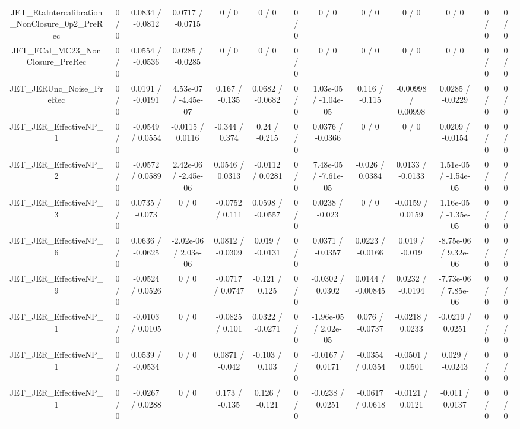 \documentclass[10pt]{article}
\begin{document}
\begin{table}[htbp]
\begin{center}
\begin{tabular}{|c|c|c|c|c|c|c|c|c|c|c|c|c|}
  JET_EtaIntercalibration_NonClosure_0p2_PreRec & 0 / 0 & 0.0834 / -0.0812 & 0.0717 / -0.0715 & 0 / 0 & 0 / 0 & 0 / 0 & 0 / 0 & 0 / 0 & 0 / 0 & 0 / 0 & 0 / 0 & 0 / 0 \\ 
  JET_FCal_MC23_NonClosure_PreRec & 0 / 0 & 0.0554 / -0.0536 & 0.0285 / -0.0285 & 0 / 0 & 0 / 0 & 0 / 0 & 0 / 0 & 0 / 0 & 0 / 0 & 0 / 0 & 0 / 0 & 0 / 0 \\ 
  JET_JERUnc_Noise_PreRec & 0 / 0 & 0.0191 / -0.0191 & 4.53e-07 / -4.45e-07 & 0.167 / -0.135 & 0.0682 / -0.0682 & 0 / 0 & 1.03e-05 / -1.04e-05 & 0.116 / -0.115 & -0.00998 / 0.00998 & 0.0285 / -0.0229 & 0 / 0 & 0 / 0 \\ 
  JET_JER_EffectiveNP_1 & 0 / 0 & -0.0549 / 0.0554 & -0.0115 / 0.0116 & -0.344 / 0.374 & 0.24 / -0.215 & 0 / 0 & 0.0376 / -0.0366 & 0 / 0 & 0 / 0 & 0.0209 / -0.0154 & 0 / 0 & 0 / 0 \\ 
  JET_JER_EffectiveNP_2 & 0 / 0 & -0.0572 / 0.0589 & 2.42e-06 / -2.45e-06 & 0.0546 / 0.0313 & -0.0112 / 0.0281 & 0 / 0 & 7.48e-05 / -7.61e-05 & -0.026 / 0.0384 & 0.0133 / -0.0133 & 1.51e-05 / -1.54e-05 & 0 / 0 & 0 / 0 \\ 
  JET_JER_EffectiveNP_3 & 0 / 0 & 0.0735 / -0.073 & 0 / 0 & -0.0752 / 0.111 & 0.0598 / -0.0557 & 0 / 0 & 0.0238 / -0.023 & 0 / 0 & -0.0159 / 0.0159 & 1.16e-05 / -1.35e-05 & 0 / 0 & 0 / 0 \\ 
  JET_JER_EffectiveNP_6 & 0 / 0 & 0.0636 / -0.0625 & -2.02e-06 / 2.03e-06 & 0.0812 / -0.0309 & 0.019 / -0.0131 & 0 / 0 & 0.0371 / -0.0357 & 0.0223 / -0.0166 & 0.019 / -0.019 & -8.75e-06 / 9.32e-06 & 0 / 0 & 0 / 0 \\ 
  JET_JER_EffectiveNP_9 & 0 / 0 & -0.0524 / 0.0526 & 0 / 0 & -0.0717 / 0.0747 & -0.121 / 0.125 & 0 / 0 & -0.0302 / 0.0302 & 0.0144 / -0.00845 & 0.0232 / -0.0194 & -7.73e-06 / 7.85e-06 & 0 / 0 & 0 / 0 \\ 
  JET_JER_EffectiveNP_1 & 0 / 0 & -0.0103 / 0.0105 & 0 / 0 & -0.0825 / 0.101 & 0.0322 / -0.0271 & 0 / 0 & -1.96e-05 / 2.02e-05 & 0.076 / -0.0737 & -0.0218 / 0.0233 & -0.0219 / 0.0251 & 0 / 0 & 0 / 0 \\ 
  JET_JER_EffectiveNP_1 & 0 / 0 & 0.0539 / -0.0534 & 0 / 0 & 0.0871 / -0.042 & -0.103 / 0.103 & 0 / 0 & -0.0167 / 0.0171 & -0.0354 / 0.0354 & -0.0501 / 0.0501 & 0.029 / -0.0243 & 0 / 0 & 0 / 0 \\ 
  JET_JER_EffectiveNP_1 & 0 / 0 & -0.0267 / 0.0288 & 0 / 0 & 0.173 / -0.135 & 0.126 / -0.121 & 0 / 0 & -0.0238 / 0.0251 & -0.0617 / 0.0618 & -0.0121 / 0.0121 & -0.011 / 0.0137 & 0 / 0 & 0 / 0 \\ 

\end{tabular}
\end{center}
\end{table}
\end{document}
